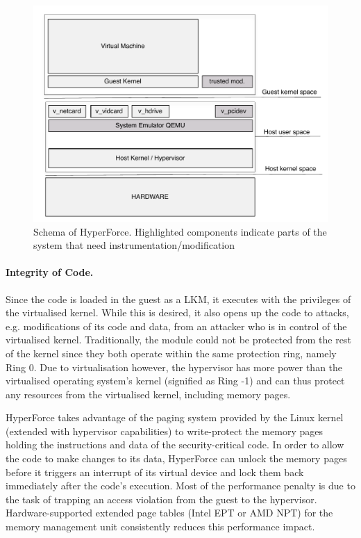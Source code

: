 \begin{figure} 
\begin{center}
\includegraphics[scale=0.5]{images/hyperforce_schema.pdf}
\caption{Schema of HyperForce. Highlighted components indicate parts of the system that need instrumentation/modification}
\label{hyperforce_schema}
\end{center}
\end{figure}

\paragraph{Integrity of Code.}
Since the code is loaded in the guest as a LKM, it executes with the privileges of the virtualised kernel. While this is desired, it also opens up the code to attacks, e.g. modifications of its code and data, from an attacker who is in control of the virtualised kernel. 
Traditionally, the module could not be protected from the rest of the kernel since they both operate within the same protection ring, namely Ring 0. 
Due to virtualisation however, the hypervisor has more power than the virtualised operating system's kernel (signified as Ring -1) and can thus protect any resources from the virtualised kernel, including memory pages. 

HyperForce takes advantage of the paging system provided by the Linux kernel (extended with hypervisor capabilities) to write-protect the memory pages holding the instructions and data of the security-critical code. 
In order to allow the code to make changes to its data, HyperForce can unlock the memory pages before it triggers an interrupt of its virtual device and lock them back immediately after the code's execution. 
Most of the performance penalty is due to the task of trapping an access violation from the guest to the hypervisor. Hardware-supported extended page tables (Intel EPT or AMD NPT) for the memory management unit consistently reduces this performance impact.

